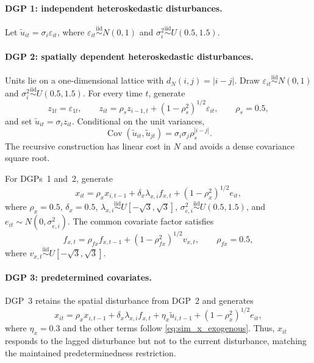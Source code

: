 \documentclass[11pt]{article}
\numberwithin{equation}{section}
\theoremstyle{remark}
\begin{document}
\paragraph{DGP 1: independent heteroskedastic disturbances.}
Let $\widetilde u_{it}=\sigma_i\varepsilon_{it}$, where $\varepsilon_{it}\stackrel{\mathrm{iid}}{\sim}N(0,1)$ and $\sigma_i^2\stackrel{\mathrm{iid}}{\sim}U(0.5,1.5)$.

\paragraph{DGP 2: spatially dependent heteroskedastic disturbances.}
Units lie on a one-dimensional lattice with $d_N(i,j)=|i-j|$. Draw $\varepsilon_{it}\stackrel{\mathrm{iid}}{\sim}N(0,1)$ and $\sigma_i^2\stackrel{\mathrm{iid}}{\sim}U(0.5,1.5)$. For every time $t$, generate
$$
z_{1t}=\varepsilon_{1t},
\qquad
z_{it}=\rho_s z_{i-1,t}+(1-\rho_s^2)^{1/2}\varepsilon_{it},
\qquad
\rho_s=0.5,
$$
and set $\widetilde u_{it}=\sigma_i z_{it}$. Conditional on the unit variances,
$$
\operatorname{Cov}(\widetilde u_{it},\widetilde u_{jt})
=
\sigma_i\sigma_j\rho_s^{|i-j|}.
$$
The recursive construction has linear cost in $N$ and avoids a dense covariance square root.

For DGPs~1 and~2, generate
\begin{equation}
\label{eq:sim_x_exogenous}
x_{it}
=
\rho_xx_{i,t-1}
+
\delta_x\lambda_{x,i}f_{x,t}
+
(1-\rho_x^2)^{1/2}e_{it},
\end{equation}
where $\rho_x=0.5$, $\delta_x=0.5$, $\lambda_{x,i}\stackrel{\mathrm{iid}}{\sim}U[-\sqrt 3,\sqrt 3]$, $\sigma_{e,i}^2\stackrel{\mathrm{iid}}{\sim}U(0.5,1.5)$, and $e_{it}\sim N(0,\sigma_{e,i}^2)$. The common covariate factor satisfies
$$
f_{x,t}=\rho_{fx}f_{x,t-1}+(1-\rho_{fx}^2)^{1/2}v_{x,t},
\qquad
\rho_{fx}=0.5,
$$
where $v_{x,t}\stackrel{\mathrm{iid}}{\sim}U[-\sqrt 3,\sqrt 3]$.

\paragraph{DGP 3: predetermined covariates.}
DGP~3 retains the spatial disturbance from DGP~2 and generates
\begin{equation}
\label{eq:sim_x_predetermined}
x_{it}
=
\rho_xx_{i,t-1}
+
\delta_x\lambda_{x,i}f_{x,t}
+
\eta_x\widetilde u_{i,t-1}
+
(1-\rho_x^2)^{1/2}e_{it},
\end{equation}
where $\eta_x=0.3$ and the other terms follow \eqref{eq:sim_x_exogenous}. Thus, $x_{it}$ responds to the lagged disturbance but not to the current disturbance, matching the maintained predeterminedness restriction.
\end{document}
